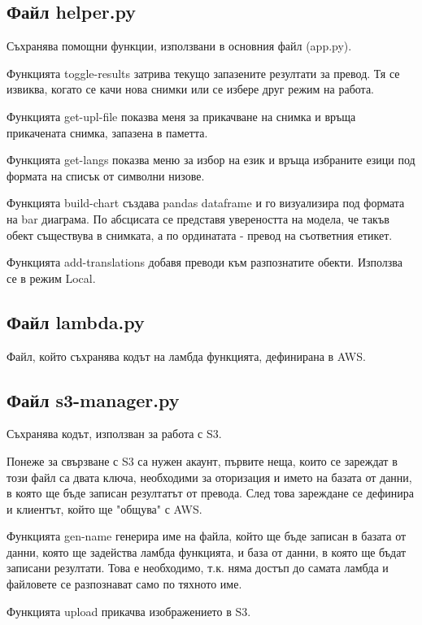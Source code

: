 \documentclass[12pt]{article}
\begin{document}
\subsection{Файл helper.py}

\noindent Съхранява помощни функции, използвани в основния файл (app.py). 

\noindent Функцията toggle-results затрива текущо запазените резултати за превод. Тя се извиква, когато се качи нова снимки или се избере друг режим на работа.

\noindent Функцията get-upl-file показва меня за прикачване на снимка и връща прикачената снимка, запазена в паметта.

\noindent Функцията get-langs показва меню за избор на език и връща избраните езици под формата на списък от символни низове.

\noindent Функцията build-chart създава pandas dataframe и го визуализира под формата на bar диаграма. По абсцисата се представя увереността на модела, че такъв обект съществува в снимката, а по ординатата - превод на съответния етикет.

\noindent Функцията add-translations добавя преводи към разпознатите обекти. Използва се в режим Local. 

\subsection{Файл lambda.py}

Файл, който съхранява кодът на ламбда функцията, дефинирана в AWS.

\subsection{Файл s3-manager.py}

Съхранява кодът, използван за работа с S3.

\noindent Понеже за свързване с S3 са нужен акаунт, първите неща, които се зареждат в този файл са двата ключа, необходими за оторизация и името на базата от данни, в която ще бъде записан резултатът от превода. След това зареждане се дефинира и клиентът, който ще "общува" с AWS.

\noindent Функцията gen-name генерира име на файла, който ще бъде записан в базата от данни, която ще задейства ламбда функцията, и база от данни, в която ще бъдат записани резултати. Това е необходимо, т.к. няма достъп до самата ламбда и файловете се разпознават само по тяхното име.

\noindent Функцията upload прикачва изображението в S3.
\end{document}
